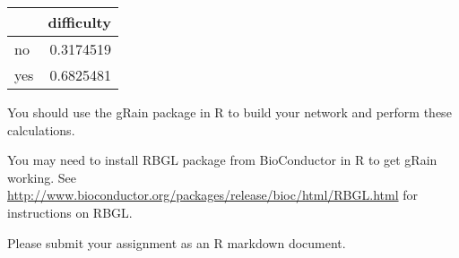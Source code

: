 \documentclass[]{article}
\begin{document}
\begin{longtable}[]{@{}lr@{}}
\toprule
& difficulty\tabularnewline
\midrule
\endhead
no & 0.3174519\tabularnewline
yes & 0.6825481\tabularnewline
\bottomrule
\end{longtable}

You should use the gRain package in R to build your network and perform
these calculations.

You may need to install RBGL package from BioConductor in R to get gRain
working. See
\url{http://www.bioconductor.org/packages/release/bioc/html/RBGL.html}
for instructions on RBGL.

Please submit your assignment as an R markdown document.
\end{document}
